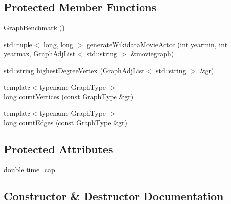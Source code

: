 \subsection*{Protected Member Functions}
\begin{DoxyCompactItemize}
\item 
\mbox{\hyperlink{classbridges_1_1benchmark_1_1_graph_benchmark_a617520fd2675b1ec03eb4eaf30affa9d}{Graph\+Benchmark}} ()
\item 
std\+::tuple$<$ long, long $>$ \mbox{\hyperlink{classbridges_1_1benchmark_1_1_graph_benchmark_a561d704a89e9e824cc6b246266cf05d7}{generate\+Wikidata\+Movie\+Actor}} (int yearmin, int yearmax, \mbox{\hyperlink{classbridges_1_1datastructure_1_1_graph_adj_list}{Graph\+Adj\+List}}$<$ std\+::string $>$ \&moviegraph)
\item 
std\+::string \mbox{\hyperlink{classbridges_1_1benchmark_1_1_graph_benchmark_a68b899e43ab8afc17cbca344004f65fb}{highest\+Degree\+Vertex}} (\mbox{\hyperlink{classbridges_1_1datastructure_1_1_graph_adj_list}{Graph\+Adj\+List}}$<$ std\+::string $>$ \&gr)
\item 
{\footnotesize template$<$typename Graph\+Type $>$ }\\long \mbox{\hyperlink{classbridges_1_1benchmark_1_1_graph_benchmark_aa8496248acdb735f170f46ee66bdb4ce}{count\+Vertices}} (const Graph\+Type \&gr)
\item 
{\footnotesize template$<$typename Graph\+Type $>$ }\\long \mbox{\hyperlink{classbridges_1_1benchmark_1_1_graph_benchmark_a18fc383926e9067fc98506449c819d22}{count\+Edges}} (const Graph\+Type \&gr)
\end{DoxyCompactItemize}
\subsection*{Protected Attributes}
\begin{DoxyCompactItemize}
\item 
double \mbox{\hyperlink{classbridges_1_1benchmark_1_1_graph_benchmark_a59938016b721fb6db2ff8bdb2c9d41c1}{time\+\_\+cap}}
\end{DoxyCompactItemize}


\subsection{Constructor \& Destructor Documentation}
\mbox{\label{classbridges_1_1benchmark_1_1_graph_benchmark_a617520fd2675b1ec03eb4eaf30affa9d}} 
